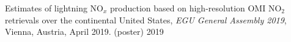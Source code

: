 \begin{cvpublications}
\publication
{Estimates of lightning NO$_x$ production based on high-resolution OMI NO$_2$ retrievals over the continental United States,
\emph{EGU General Assembly 2019},
Vienna, Austria, April 2019. (poster)} %
{2019} %

\end{cvpublications}
